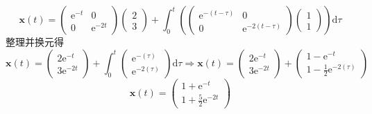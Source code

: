 \documentclass[UTF8,a4paper]{ctexart}
\begin{document}
\section{}
$$\mathbf{x}(t)=\begin{pmatrix} \mathrm{e}^{-t} &0 \\0&\mathrm{e}^{-2t}\end{pmatrix} \begin{pmatrix} 2 \\3\end{pmatrix}+\int_0^t  (\begin{pmatrix} \mathrm{e}^{-(t-\tau)} &0 \\0&\mathrm{e}^{-2(t-\tau)}\end{pmatrix} \begin{pmatrix} 1 \\1\end{pmatrix} )\mathrm{d}\tau$$整理并换元得
$$\mathbf{x}(t)=\begin{pmatrix} 2\mathrm{e}^{-t} \\3\mathrm{e}^{-2t}\end{pmatrix}+\int_0^t  \begin{pmatrix} \mathrm{e}^{-(\tau)}\\\mathrm{e}^{-2(\tau)}\end{pmatrix}\mathrm{d}\tau \Rightarrow
\mathbf{x}(t)=\begin{pmatrix} 2\mathrm{e}^{-t} \\3\mathrm{e}^{-2t}\end{pmatrix}+\begin{pmatrix} 1-\mathrm{e}^{-t}\\1-\frac{1}{2}\mathrm{e}^{-2(\tau)}\end{pmatrix}$$
$$\mathbf{x}(t)=\begin{pmatrix} 1+\mathrm{e}^{-t} \\1+\frac{5}{2}\mathrm{e}^{-2t}\end{pmatrix}$$
\end{document}
